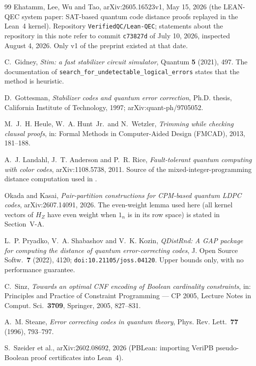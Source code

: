\documentclass[11pt]{amsart}
\newcommand{\HZ}{H_{Z}}
\theoremstyle{plain}
\theoremstyle{definition}
\theoremstyle{remark}
\begin{document}
\begin{thebibliography}{99}
Ehatamm, Lee, Wu and Tao,
arXiv:2605.16523v1, May 15, 2026 (the LEAN-QEC system paper: SAT-based
quantum code distance proofs replayed in the Lean~4 kernel). Repository
\texttt{VerifiedQC/Lean-QEC}; statements about the repository in this note
refer to commit \texttt{c73827d} of July 10, 2026, inspected August 4, 2026.
Only v1 of the preprint existed at that date.

C.~Gidney,
\emph{Stim: a fast stabilizer circuit simulator},
Quantum \textbf{5} (2021), 497. The documentation of
\texttt{search\_for\_undetectable\_logical\_errors} states that the method is
heuristic.

D.~Gottesman,
\emph{Stabilizer codes and quantum error correction},
Ph.D. thesis, California Institute of Technology, 1997;
arXiv:quant-ph/9705052.

M.~J.~H. Heule, W.~A. Hunt~Jr.\ and N.~Wetzler,
\emph{Trimming while checking clausal proofs},
in: Formal Methods in Computer-Aided Design (FMCAD), 2013, 181--188.

A.~J. Landahl, J.~T. Anderson and P.~R. Rice,
\emph{Fault-tolerant quantum computing with color codes},
arXiv:1108.5738, 2011. Source of the mixed-integer-programming distance
computation used in \cite{BCGMRY}.

Okada and Kasai,
\emph{Pair-partition constructions for CPM-based quantum LDPC codes},
arXiv:2607.14091, 2026. The even-weight lemma used here (all kernel vectors of
$\HZ$ have even weight when $1_n$ is in its row space) is stated in
Section~V-A.

L.~P. Pryadko, V.~A. Shabashov and V.~K. Kozin,
\emph{QDistRnd: A GAP package for computing the distance of quantum
error-correcting codes},
J. Open Source Softw.\ \textbf{7} (2022), 4120;
\texttt{doi:10.21105/joss.04120}. Upper bounds only, with no performance
guarantee.

C.~Sinz,
\emph{Towards an optimal CNF encoding of Boolean cardinality constraints},
in: Principles and Practice of Constraint Programming --- CP 2005, Lecture
Notes in Comput. Sci.\ \textbf{3709}, Springer, 2005, 827--831.

A.~M. Steane,
\emph{Error correcting codes in quantum theory},
Phys. Rev. Lett.\ \textbf{77} (1996), 793--797.

S.~Szeider et al.,
arXiv:2602.08692, 2026 (PBLean: importing VeriPB pseudo-Boolean proof
certificates into Lean~4).


\end{thebibliography}
\end{document}
